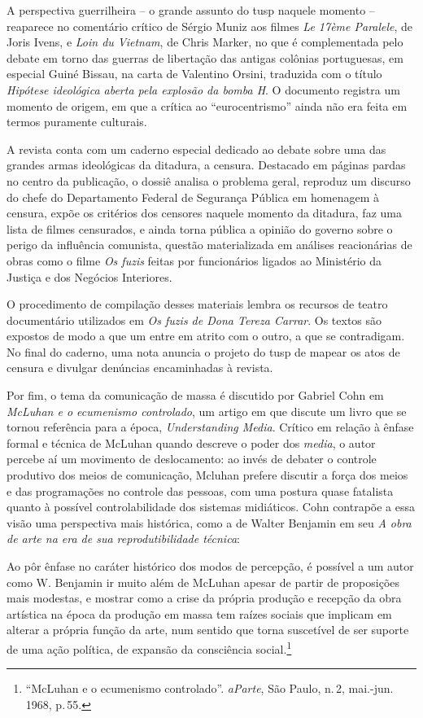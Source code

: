 A perspectiva guerrilheira -- o grande assunto do {\sc tusp} naquele momento --
reaparece no comentário crítico de Sérgio Muniz aos filmes {\it Le 17ème
Paralele}, de Joris Ivens, e {\it Loin du Vietnam}, de Chris Marker, no
que é complementada pelo debate em torno das guerras de libertação das
antigas colônias portuguesas, em especial Guiné Bissau, na carta de
Valentino Orsini, traduzida com o título {\it Hipótese ideológica aberta
pela explosão da bomba H}. O documento registra um momento de origem, em
que a crítica ao “eurocentrismo” ainda não era feita em termos puramente
culturais.

A revista conta com um caderno especial dedicado ao debate sobre uma das
grandes armas ideológicas da ditadura, a censura. Destacado em páginas
pardas no centro da publicação, o dossiê analisa o problema geral,
reproduz um discurso do chefe do Departamento Federal de Segurança
Pública em homenagem à censura, expõe os critérios dos censores naquele
momento da ditadura, faz uma lista de filmes censurados, e ainda torna
pública a opinião do governo sobre o perigo da influência comunista,
questão materializada em análises reacionárias de obras como o filme
{\it Os fuzis} feitas por funcionários ligados ao Ministério da Justiça
e dos Negócios Interiores.

O procedimento de compilação desses materiais lembra os recursos de
teatro documentário utilizados em {\it Os fuzis de Dona Tereza Carrar}.
Os textos são expostos de modo a que um entre em atrito com o outro, a
que se contradigam. No final do caderno, uma nota anuncia o projeto do
{\sc tusp} de mapear os atos de censura e divulgar denúncias encaminhadas à
revista.

Por fim, o tema da comunicação de massa é discutido por Gabriel Cohn em
{\it McLuhan e o ecumenismo controlado}, um artigo em que discute um
livro que se tornou referência para a época, {\it Understanding Media}.
Crítico em relação à ênfase formal e técnica de McLuhan quando descreve
o poder dos {\it media}, o autor percebe aí um movimento de
deslocamento: ao invés de debater o controle produtivo dos meios de
comunicação, Mcluhan prefere discutir a força dos meios e das
programações no controle das pessoas, com uma postura quase fatalista
quanto à possível controlabilidade dos sistemas midiáticos. Cohn
contrapõe a essa visão uma perspectiva mais histórica, como a de Walter
Benjamin em seu {\it A obra de arte na era de sua reprodutibilidade
técnica}:

\startblockquote
Ao pôr ênfase no caráter histórico dos modos de percepção, é possível a
um autor como W. Benjamin ir muito além de McLuhan apesar de partir de
proposições mais modestas, e mostrar como a crise da própria produção e
recepção da obra artística na época da produção em massa tem raízes
sociais que implicam em alterar a própria função da arte, num sentido
que torna suscetível de ser suporte de uma ação política, de expansão da
consciência social.\footnote{“McLuhan e o ecumenismo controlado”.
  {\it aParte}, São Paulo, n.\,2, mai.-jun. 1968, p.\,55.}
\stopblockquote

